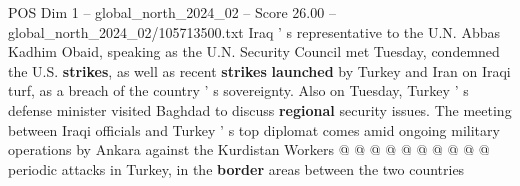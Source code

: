 \begin{textsample}{POS Dim 1 – global\_north\_2024\_02 – Score 26.00 – global\_north\_2024\_02/105713500.txt}
Iraq ' s representative to the U.N.
Abbas Kadhim Obaid, speaking as the U.N.
Security Council met Tuesday, condemned the U.S. \textbf{strikes}, as well as recent \textbf{strikes} \textbf{launched} by Turkey and Iran on Iraqi turf, as a breach of the country ' s sovereignty.
Also on Tuesday, Turkey ' s defense minister visited Baghdad to discuss \textbf{regional} security issues.
The meeting between Iraqi officials and Turkey ' s top diplomat comes amid ongoing military operations by Ankara against the Kurdistan Workers @ @ @ @ @ @ @ @ @ @ periodic attacks in Turkey, in the \textbf{border} areas between the two countries

\end{textsample}
